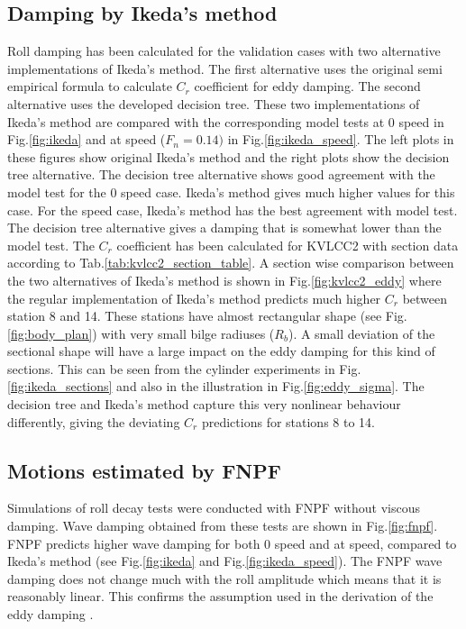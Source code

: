 \subsection*{Damping by Ikeda's method}\label{damping-by-ikedas-method}
Roll damping has been calculated for the validation cases with two
alternative implementations of Ikeda's method. The first alternative
uses the original semi empirical formula to calculate $C_r$
coefficient for eddy damping. The second alternative uses the developed
decision tree. These two implementations of Ikeda's method are compared
with the corresponding model tests at 0 speed in
Fig.\ref{fig:ikeda} and at speed ($F_n=0.14)$ in
Fig.\ref{fig:ikeda_speed}. The left plots in these figures show
original Ikeda's method and the right plots show the decision tree
alternative. The decision tree alternative shows good agreement with the
model test for the 0 speed case. Ikeda's method gives much higher values
for this case. For the speed case, Ikeda's method has the best agreement
with model test. The decision tree alternative gives a damping that is
somewhat lower than the model test.
The $C_r$ coefficient has been calculated for KVLCC2 with section data
according to Tab.\ref{tab:kvlcc2_section_table}. A section wise
comparison between the two alternatives of Ikeda's method is shown in
Fig.\ref{fig:kvlcc2_eddy} where the regular implementation of
Ikeda's method predicts much higher $C_r$ between station 8 and 14.
These stations have almost rectangular shape (see
Fig.\ref{fig:body_plan}) with very small bilge radiuses
($R_b$). A small deviation of the sectional shape will have a large
impact on the eddy damping for this kind of sections. This can be seen
from the cylinder experiments in Fig.\ref{fig:ikeda_sections}
and also in the illustration in Fig.\ref{fig:eddy_sigma}. The
decision tree and Ikeda's method capture this very nonlinear behaviour
differently, giving the deviating $C_r$ predictions for stations 8 to
14.
\subsection*{Motions estimated by FNPF}\label{motions-estimated-by-fnpf}
Simulations of roll decay tests were conducted with FNPF without viscous
damping. Wave damping obtained from these tests are shown in
Fig.\ref{fig:fnpf}. FNPF predicts higher wave damping for both 0
speed and at speed, compared to Ikeda's method (see
Fig.\ref{fig:ikeda} and Fig.\ref{fig:ikeda_speed}). The
FNPF wave damping does not change much with the roll amplitude which
means that it is reasonably linear. This confirms the assumption used in
the derivation of the eddy damping \citep{7505983/4AFVVGNT}.
